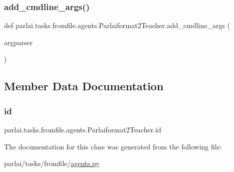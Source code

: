 \subsubsection{\texorpdfstring{add\+\_\+cmdline\+\_\+args()}{add\_cmdline\_args()}}
{\footnotesize\ttfamily def parlai.\+tasks.\+fromfile.\+agents.\+Parlaiformat2\+Teacher.\+add\+\_\+cmdline\+\_\+args (\begin{DoxyParamCaption}\item[{}]{argparser }\end{DoxyParamCaption})\hspace{0.3cm}{\ttfamily [static]}}



\subsection{Member Data Documentation}
\mbox{\label{classparlai_1_1tasks_1_1fromfile_1_1agents_1_1Parlaiformat2Teacher_aeea3091d7296c9abc5376a3b920a31b8}} 
\subsubsection{\texorpdfstring{id}{id}}
{\footnotesize\ttfamily parlai.\+tasks.\+fromfile.\+agents.\+Parlaiformat2\+Teacher.\+id}



The documentation for this class was generated from the following file\+:\begin{DoxyCompactItemize}
\item 
parlai/tasks/fromfile/\hyperlink{parlai_2tasks_2fromfile_2agents_8py}{agents.\+py}\end{DoxyCompactItemize}
